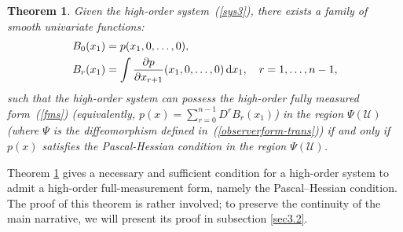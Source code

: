 \documentclass[11pt]{article}
\newtheorem{theorem}{Theorem}
\begin{document}
\begin{theorem}\label{thm:PH}
	Given the high-order system~(\ref{sys3}), there exists a family of smooth univariate functions:
	\begin{align}
		B_0(x_1) &= p(x_1, 0, \ldots, 0), \label{eq:B0} \\
		B_r(x_1) &= \int \frac{\partial p}{\partial x_{r+1}}(x_1, 0, \ldots, 0) \, {\rm d}x_1,\quad r = 1, \ldots, n-1, \label{eq:Br}
	\end{align}
	such that the high-order system can possess the high-order fully measured form~(\ref{fms}) (equivalently, $p(x)=\sum_{r=0}^{n-1} D^r B_r(x_1)$) in the region $\Psi(\mathcal{U})$ (where $\Psi$ is the diffeomorphism defined in~(\ref{observerform-trans})) if and only if $p(x)$ satisfies the Pascal-Hessian condition in the region $\Psi(\mathcal{U})$. 
\end{theorem}

Theorem \ref{thm:PH} gives a necessary and sufficient condition for a high-order system to admit a high-order full-measurement form, namely the Pascal--Hessian condition. The proof of this theorem is rather involved; to preserve the continuity of the main narrative, we will present its proof in subsection \ref{sec3.2}. 
\end{document}
